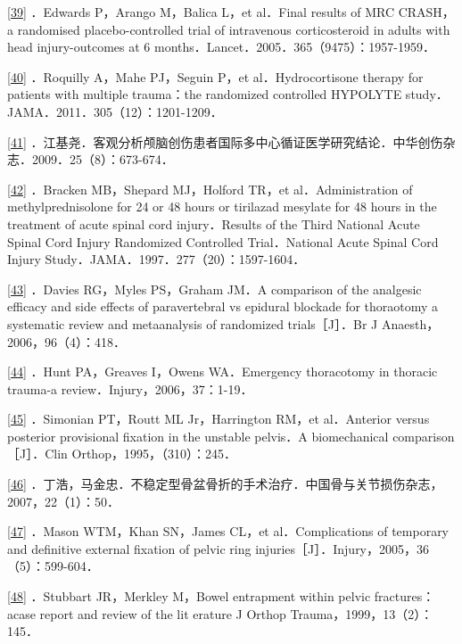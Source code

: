 \protect\hyperlink{text00024.htmlux5cux23ch39-23-back}{{[}39{]}}
．Edwards P，Arango M，Balica L，et al．Final results of MRC CRASH，a
randomised placebo-controlled trial of intravenous corticosteroid in
adults with head injury-outcomes at 6
months．Lancet．2005．365（9475）：1957-1959．

\protect\hyperlink{text00024.htmlux5cux23ch40-23-back}{{[}40{]}}
．Roquilly A，Mahe PJ，Seguin P，et al．Hydrocortisone therapy for
patients with multiple trauma：the randomized controlled HYPOLYTE
study．JAMA．2011．305（12）：1201-1209．

\protect\hyperlink{text00024.htmlux5cux23ch41-23-back}{{[}41{]}}
．江基尧．客观分析颅脑创伤患者国际多中心循证医学研究结论．中华创伤杂志．2009．25（8）：673-674．

\protect\hyperlink{text00024.htmlux5cux23ch42-23-back}{{[}42{]}}
．Bracken MB，Shepard MJ，Holford TR，et al．Administration of
methylprednisolone for 24 or 48 hours or tirilazad mesylate for 48 hours
in the treatment of acute spinal cord injury．Results of the Third
National Acute Spinal Cord Injury Randomized Controlled Trial．National
Acute Spinal Cord Injury Study．JAMA．1997．277（20）：1597-1604．

\protect\hyperlink{text00024.htmlux5cux23ch43-23-back}{{[}43{]}}
．Davies RG，Myles PS，Graham JM．A comparison of the analgesic efficacy
and side effects of paravertebral vs epidural blockade for thoraotomy a
systematic review and metaanalysis of randomized trials［J］．Br J
Anaesth，2006，96（4）：418．

\protect\hyperlink{text00024.htmlux5cux23ch44-23-back}{{[}44{]}} ．Hunt
PA，Greaves I，Owens WA．Emergency thoracotomy in thoracic trauma-a
review．Injury，2006，37：1-19．

\protect\hyperlink{text00024.htmlux5cux23ch45-23-back}{{[}45{]}}
．Simonian PT，Routt ML Jr，Harrington RM，et al．Anterior versus
posterior provisional fixation in the unstable pelvis．A biomechanical
comparison［J］．Clin Orthop，1995，（310）：245．

\protect\hyperlink{text00024.htmlux5cux23ch46-23-back}{{[}46{]}}
．丁浩，马金忠．不稳定型骨盆骨折的手术治疗．中国骨与关节损伤杂志，2007，22（1）：50．

\protect\hyperlink{text00024.htmlux5cux23ch47-23-back}{{[}47{]}} ．Mason
WTM，Khan SN，James CL，et al．Complications of temporary and definitive
external fixation of pelvic ring
injuries［J］．Injury，2005，36（5）：599-604．

\protect\hyperlink{text00024.htmlux5cux23ch48-23-back}{{[}48{]}}
．Stubbart JR，Merkley M，Bowel entrapment within pelvic
fractures：acase report and review of the lit erature J Orthop
Trauma，1999，13（2）：145．

\protect\hypertarget{text00025.html}{}{}


